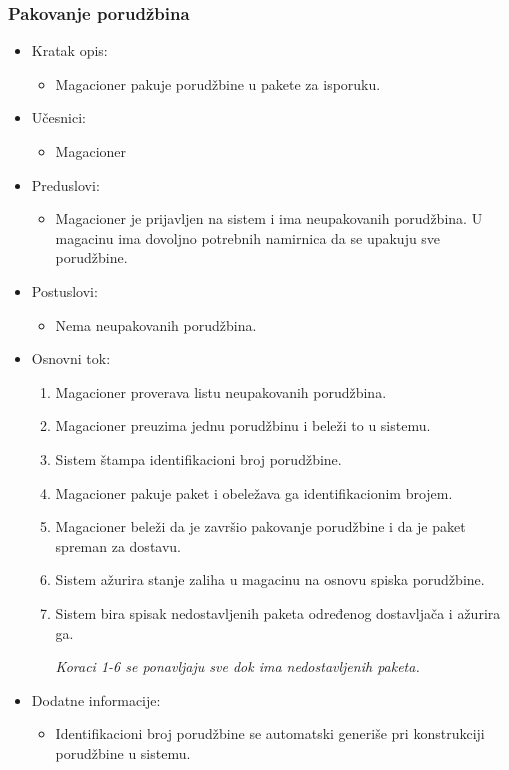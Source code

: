 
\subsubsection{Pakovanje porudžbina}
	\begin{itemize}
		\item{Kratak opis:} 
		\begin{itemize}
			\item{Magacioner pakuje porudžbine u pakete za isporuku.}
		\end{itemize}
		
		\item{Učesnici:} 
		\begin{itemize}
			\item{Magacioner}
		\end{itemize}		

		\item{Preduslovi:}
		\begin{itemize}
			\item{Magacioner je prijavljen na sistem i ima neupakovanih porudžbina. U magacinu ima dovoljno potrebnih namirnica da se upakuju sve porudžbine.}
		\end{itemize}
		
		\item{Postuslovi:}
		\begin{itemize}
			\item{Nema neupakovanih porudžbina.}
		\end{itemize}
		
		\item{Osnovni tok:}
		\begin{enumerate}
			\item{Magacioner proverava listu neupakovanih porudžbina.}
			\item{Magacioner preuzima jednu porudžbinu i beleži to u sistemu.}
			\item{Sistem štampa identifikacioni broj porudžbine.}
			\item{Magacioner pakuje paket i obeležava ga identifikacionim brojem.}
			\item{Magacioner beleži da je završio pakovanje porudžbine i da je paket spreman za dostavu.}
			\item{Sistem ažurira stanje zaliha u magacinu na osnovu spiska porudžbine.}
			\item{Sistem bira spisak nedostavljenih paketa određenog dostavljača i ažurira ga.}


			\textit{Koraci 1-6 se ponavljaju sve dok ima nedostavljenih paketa.}
		\end{enumerate}
		\item{Dodatne informacije:}
		\begin{itemize}
			\item{Identifikacioni broj porudžbine se automatski generiše pri konstrukciji porudžbine u sistemu.}
		\end{itemize}

	\end{itemize}
